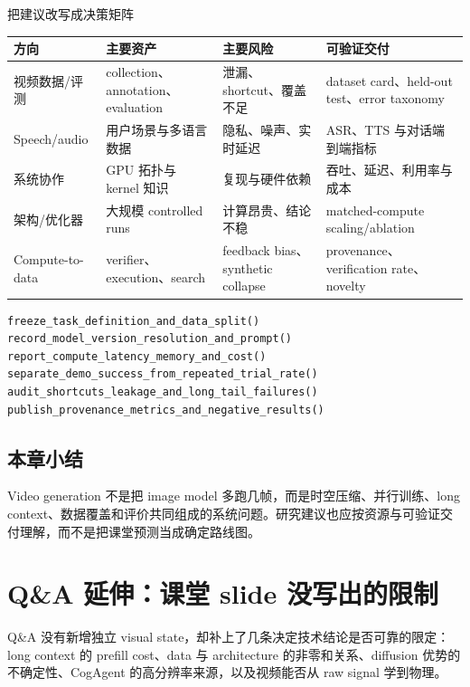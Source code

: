 \documentclass[a4paper]{article}
\begin{document}
\begin{knowledgebox}{把建议改写成决策矩阵}
\small\sloppy
\begin{tabularx}{\textwidth}{L{0.17\textwidth} L{0.20\textwidth} L{0.20\textwidth} X}
\toprule
方向 & 主要资产 & 主要风险 & 可验证交付 \\
\midrule
视频数据/评测 & collection、annotation、evaluation & 泄漏、shortcut、覆盖不足 & dataset card、held-out test、error taxonomy \\
Speech/audio & 用户场景与多语言数据 & 隐私、噪声、实时延迟 & ASR、TTS 与对话端到端指标 \\
系统协作 & GPU 拓扑与 kernel 知识 & 复现与硬件依赖 & 吞吐、延迟、利用率与成本 \\
架构/优化器 & 大规模 controlled runs & 计算昂贵、结论不稳 & matched-compute scaling/ablation \\
Compute-to-data & verifier、execution、search & feedback bias、synthetic collapse & provenance、verification rate、novelty \\
\bottomrule
\end{tabularx}
\end{knowledgebox}

\begin{lstlisting}[caption={多模态研究项目的发布前检查}]
freeze_task_definition_and_data_split()
record_model_version_resolution_and_prompt()
report_compute_latency_memory_and_cost()
separate_demo_success_from_repeated_trial_rate()
audit_shortcuts_leakage_and_long_tail_failures()
publish_provenance_metrics_and_negative_results()
\end{lstlisting}


\subsection{本章小结}

Video generation 不是把 image model 多跑几帧，而是时空压缩、并行训练、long context、数据覆盖和评价共同组成的系统问题。研究建议也应按资源与可验证交付理解，而不是把课堂预测当成确定路线图。

\section{Q\&A 延伸：课堂 slide 没写出的限制}

Q\&A 没有新增独立 visual state，却补上了几条决定技术结论是否可靠的限定：long context 的 prefill cost、data 与 architecture 的非零和关系、diffusion 优势的不确定性、CogAgent 的高分辨率来源，以及视频能否从 raw signal 学到物理。
\end{document}
